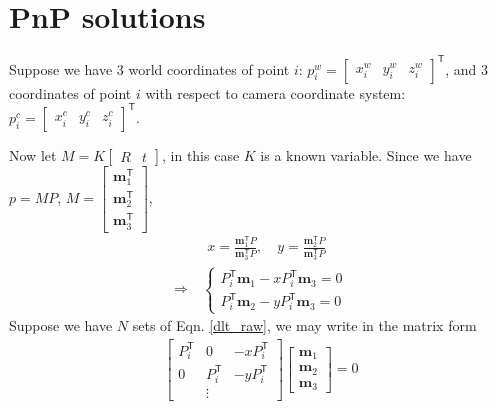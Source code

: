 \documentclass[11pt]{article}
\newcommand{\ttt}{\mathsf{T}}
\begin{document}
\section{PnP solutions}
Suppose we have 3 world coordinates of point $i$: $p^w_i=\left[\begin{array}{ccc}x^w_i & y^w_i & z^w_i\end{array}\right]^\mathsf{T}$, and 3 coordinates of point $i$ with respect to camera coordinate system: $p^c_i=\left[\begin{array}{ccc}x^c_i & y^c_i & z^c_i\end{array}\right]^\mathsf{T}$. 

Now let $M=K\left[\begin{array}{cc}R & t\end{array}\right]$, in this case $K$ is a known variable. Since we have $p=MP$, $M=\left[\begin{array}{c}\textbf{m}^\mathsf{T}_1\\\textbf{m}^\mathsf{T}_2\\\textbf{m}^\mathsf{T}_3\end{array}\right]$,
\begin{align*}
& x=\frac{\textbf{m}^\ttt_1P}{\textbf{m}^\ttt_3P}, \quad y=\frac{\textbf{m}^\ttt_2P}{\textbf{m}^\ttt_3P}
\end{align*}
\begin{align}
\Rightarrow & \ \left\{
\begin{array}{l}
P^\ttt_i\textbf{m}_1-xP^\ttt_i\textbf{m}_3=0 \\
P^\ttt_i\textbf{m}_2-yP^\ttt_i\textbf{m}_3=0
\end{array}\right.
\label{dlt_raw}
\end{align}
Suppose we have $N$ sets of Eqn. \ref{dlt_raw}, we may write in the matrix form
\begin{align}
\left[\begin{array}{ccc}
P^\ttt_i & 0 & -xP^\ttt_i \\
0 & P^\ttt_i & -yP^\ttt_i \\
 & \vdots & 
\end{array}\right]
\left[\begin{array}{c}
\textbf{m}_1 \\
\textbf{m}_2 \\
\textbf{m}_3
\end{array}\right]=0
\end{align}
\end{document}
